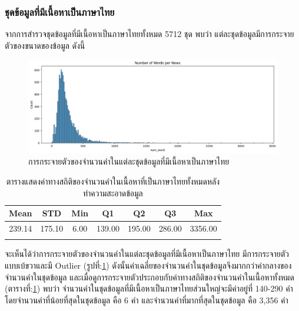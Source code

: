 \documentclass[12pt,oneside,openright,a4paper]{cpe-thai-project}
\begin{document}
      \subsubsection{ชุดข้อมูลที่มีเนื้อหาเป็นภาษาไทย}
        \hspace{1cm}จากการสำรวจชุดข้อมูลที่มีเนื้อหาเป็นภาษาไทยทั้งหมด 5712 ชุด พบว่า แต่ละชุดข้อมูลมีการกระจายตัวของขนาดของข้อมูล \newline ดังนี้
        \begin{figure}[!ht]\centering
          \includegraphics[width=\textwidth]{./img/thai_stat/hist_all_word.png}
          \caption{การกระจายตัวของจำนวนคำในแต่ละชุดข้อมูลที่มีเนื้อหาเป็นภาษาไทย}\label{fig:thai_hist}
        \end{figure}
        \begin{longtable}[!ht]{ccccccc}
          \caption{ตารางแสดงค่าทางสถิติของจำนวนคำในเนื้อหาที่เป็นภาษาไทยทั้งหมดหลังทำความสะอาดข้อมูล}
          \label{tbl:thai_stat_all}\\
          \hhline{=======}
          \textbf{Mean} & \textbf{STD} & \textbf{Min} & \textbf{Q1} & \textbf{Q2} & \textbf{Q3} & \textbf{Max}\\ \hline
          \endhead
          239.14 & 175.10 & 6.00 & 139.00 & 195.00 & 286.00 & 3356.00  \\ \hhline{=======}%
        \end{longtable}
        \hspace{1cm}จะเห็นได้ว่าการกระจายตัวของจำนวนคำในแต่ละชุดข้อมูลที่มีเนื้อหาเป็นภาษาไทย มีการกระจายตัวแบบเบ้ขวาและมี Outlier (รูปที่:\ref{fig:thai_hist}) 
        ดังนั้นค่าเฉลี่ยของจำนวนคำในชุดข้อมูลจึงมากกว่าค่ากลางของจำนวนคำในชุดข้อมูล และเมื่อดูการกระจายตัวประกอบกับค่าทางสถิติของจำนวนคำในเนื้อหาทั้งหมด
        (ตารางที่:\ref{tbl:thai_stat_all}) พบว่า จำนวนคำในชุดข้อมูลที่มีเนื้อหาเป็นภาษาไทยส่วนใหญ่จะมีค่าอยู่ที่ 140-290 คำ โดยจำนวนคำที่น้อยที่สุดในชุดข้อมูล คือ 6 คำ
        และจำนวนคำที่มากที่สุดในชุดข้อมูล คือ 3,356 คำ
        
\end{document}

